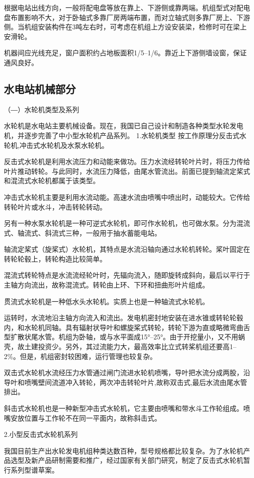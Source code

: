 \documentclass{ctexbook}
\begin{document}
根据电站出线方向，一般将配电盘等放在靠上、下游侧或靠两端。机组型式对配电盘布置影响不大，对于卧轴式多靠厂房两端布置，而对立轴式则多靠厂房上、下游侧。当机组安装构件在3吨左右时，可考虑在机组上方设安装梁，检修时可在梁上安滑轮。

机器间应光线充足，窗户面积约占地板面积1/5--1/6。靠近上下游侧墙设窗，保证通风良好。

\subsection{水电站机械部分}
（―）水轮机类型及系列

水轮机是水电站主要机械设备。现在，我国已自己设计和制造各种类型水轮发电机，并逐步完善了中小型水轮机产品系列。
1.水轮机类型
按工作原理分反击式水轮机,冲击式水轮机及水泵水轮机。

反击式水轮机是利用水流压力和动能来做功。压力水流经转轮叶片时，将压力传给叶片推动转轮。与此同时，水流压力降低，由尾水管流出。前面已提到轴流定桨式和混流式水轮机都属于该类型。

冲击式水轮机主要是利用水流动能。高速水流由喷嘴中喷出时，动能较大。它传给转轮叶片或水斗，冲击转轮转动。

另有一种水泵水轮机是一种可逆式水轮机，即可作水轮机，也可做水泵。分为混流式、轴流式、斜流式三种，一般用于抽水蓄能电站。

轴流定桨式（旋桨式）水轮机，其特点是水流沿轴向通过水轮机转轮。桨叶固定在转轮轮毂上，转轮构造比较简单。

混流式转轮特点是水流流经轮叶时，先辐向流入，随即旋转成斜向，最后以平行于主轴方向流出，故称混流式。转轮由上环、下环和扭曲形叶片组成。

贯流式水轮机是一种低水头水轮机。实质上也是一种轴流式水轮机。

运转时，水流地沿主轴方向流入和流出。发电机密封地安装在进水锥或转轮轮毂内，和水轮机同轴。具有辐射状导叶和螺旋桨式转轮，转轮下游为直或略微弯曲舌型扩散状尾水管。机组为卧轴，或与水平面成15°--25°。由于开挖量小，又不用蜗壳，故土建投资少。另外，其过流能力大，最高效率比立式转桨机组还要高1--2\%。但是，机组密封较困难，运行管理也较复杂。

双击式水轮机水流经压力水管通过闸门流进水轮机喷嘴，导叶把水流分成两股，沿导叶和喷嘴壁间流道冲入转轮，两次冲击转轮叶片,故称双击式,最后水流由尾水管排出。

斜击式水轮机也是一种新型冲击式水轮机，它主要由喷嘴和带水斗工作轮组成。喷嘴安放位置与工作轮不在同一平面内，故称斜击式。

2.小型反击式水轮机系列

我国目前生产出水轮发电机组种类达数百种，型号规格都比较复杂。为了水轮机产品选型及新产品研制需要和推广，经过国家有关部门研究，制定了反击式水轮机暂行系列型谱草案。
\end{document}
